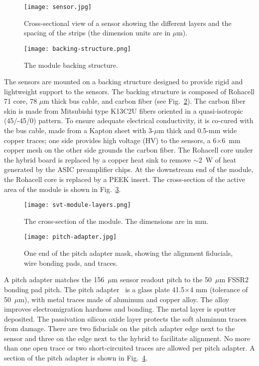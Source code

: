 \begin{figure}[hbt] 
\centering 
\texttt{[image: sensor.jpg]}
\caption{Cross-sectional view of a sensor showing the different layers and the spacing of the strips (the dimension units are in $\mu$m).}
\label{fig:sensor}
\end{figure}

\begin{figure}[hbt] 
\centering 
\texttt{[image: backing-structure.png]}
\caption{The module backing structure.}
\label{fig:backing-structure}
\end{figure}

The sensors are mounted on a backing structure designed to provide rigid and lightweight support to the sensors. The backing structure is composed of Rohacell 71 core, 78 $\mu$m thick bus cable, and carbon fiber (see Fig.~\ref{fig:backing-structure}). The carbon fiber skin is made from Mitsubishi type K13C2U fibers oriented in a quasi-isotropic (45/-45/0) pattern. To ensure adequate electrical conductivity, it is co-cured with the bus cable, made from a Kapton sheet with 3-$\mu$m thick and 0.5-mm wide copper traces; one side provides high voltage (HV) to the sensors, a 6$\times$6~mm copper mesh on the other side grounds the carbon fiber.  The Rohacell core under the hybrid board is replaced by a copper heat sink to remove $\sim$2~W of heat generated by the ASIC preamplifier chips. At the downstream end of the module, the Rohacell core is replaced by a PEEK insert. The cross-section of the active area of the module is shown in Fig.~\ref{fig:svt-module-layers}. 

\begin{figure}[hbt] 
\centering 
\texttt{[image: svt-module-layers.png]}
\caption{The cross-section of the module. The dimensions are in mm.}
\label{fig:svt-module-layers}
\end{figure}

\begin{figure}[hbt] 
\centering 
\texttt{[image: pitch-adapter.jpg]}
\caption{One end of the pitch adapter mask, showing the alignment fiducials, wire bonding pads, and traces.}
\label{fig:pitch-adapter}
\end{figure}

A pitch adapter matches the 156~$\mu$m sensor readout pitch to the 50~$\mu$m FSSR2 bonding pad pitch. The pitch adapter~\cite{PA} is a glass plate 41.5$\times$4 mm (tolerance of 50~$\mu$m), with metal traces made of aluminum and copper alloy. The alloy improves electromigration hardness and bonding. The metal layer is sputter deposited. The passivation silicon oxide layer protects the soft aluminum traces from damage. There are two fiducials on the pitch adapter edge next to the sensor and three on the edge next to the hybrid to facilitate alignment. No more than one open trace or two short-circuited traces are allowed per pitch adapter. A section of the pitch adapter is shown in Fig.~\ref{fig:pitch-adapter}. 

